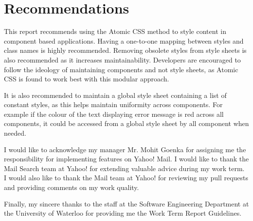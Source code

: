 \documentclass[12pt]{article}
\begin{document}
\newpage

\section{Recommendations}
This report recommends using the Atomic CSS method to style content in component based applications. Having a one-to-one mapping between styles and class names is highly recommended. Removing obsolete styles from style sheets is also recommended as it increases maintainability. Developers are encouraged to follow the ideology of maintaining components and not style sheets, as Atomic CSS is found to work best with this modular approach.

It is also recommended to maintain a global style sheet containing a list of constant styles, as this helps maintain uniformity across components. For example if the colour of the text displaying error message is red across all components, it could be accessed from a global style sheet by all component when needed. 


\newpage



\newpage


I would like to acknowledge my manager Mr. Mohit Goenka for assigning me the responsibility for implementing features on Yahoo! Mail. I would like to thank the Mail Search team at Yahoo! for extending valuable advice during my work term. I would also like to thank the Mail team at Yahoo! for reviewing my pull requests and providing comments on my work quality.

Finally, my sincere thanks to the staff at the Software Engineering Department at the University of Waterloo for providing me the Work Term Report Guidelines.
\newpage


\end{document}
